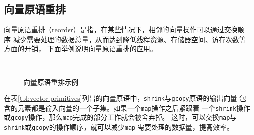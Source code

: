 \subsection{向量原语重排}
向量原语重排（reorder）是指，在某些情况下，相邻的向量操作可以通过交换顺序
减少需要处理的数据总量，从而达到降低线程资源、存储器空间、访存次数等方面的开销，
下面举例说明向量原语重排的应用。
\begin{quotation}
\end{quotation}
\begin{figure}
  \centering
  \\
  \caption{向量原语重排示例}
  \label{fig:vp-reorder}
\end{figure}

在表\ref{tbl:vector-primitives}列出的向量原语中，\texttt{shrink}与\texttt{gcopy}原语的输出向量
包含的元素都是输入向量的一个子集。如果一个\texttt{map}操作之后紧跟着
一个\texttt{shrink}操作或\texttt{gcopy}操作，那么\texttt{map}完成的部分工作就会被舍弃掉。
这时，可以交换\texttt{map}与\texttt{shrink}或\texttt{gcopy}的操作顺序，就可以减少\texttt{map}
需要处理的数据量，提高效率。

